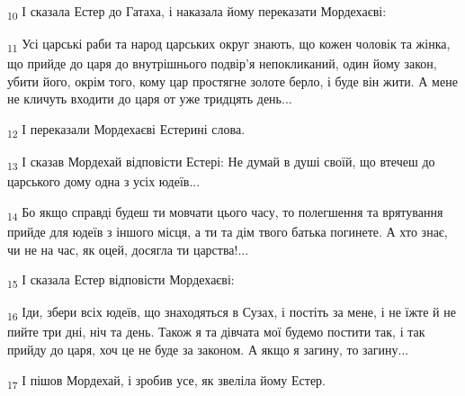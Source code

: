\begin{tcolorbox}
\textsubscript{10} І сказала Естер до Гатаха, і наказала йому переказати Мордехаєві:
\end{tcolorbox}
\begin{tcolorbox}
\textsubscript{11} Усі царські раби та народ царських округ знають, що кожен чоловік та жінка, що прийде до царя до внутрішнього подвір'я непокликаний, один йому закон, убити його, окрім того, кому цар простягне золоте берло, і буде він жити. А мене не кличуть входити до царя от уже тридцять день...
\end{tcolorbox}
\begin{tcolorbox}
\textsubscript{12} І переказали Мордехаєві Естерині слова.
\end{tcolorbox}
\begin{tcolorbox}
\textsubscript{13} І сказав Мордехай відповісти Естері: Не думай в душі своїй, що втечеш до царського дому одна з усіх юдеїв...
\end{tcolorbox}
\begin{tcolorbox}
\textsubscript{14} Бо якщо справді будеш ти мовчати цього часу, то полегшення та врятування прийде для юдеїв з іншого місця, а ти та дім твого батька погинете. А хто знає, чи не на час, як оцей, досягла ти царства!...
\end{tcolorbox}
\begin{tcolorbox}
\textsubscript{15} І сказала Естер відповісти Мордехаєві:
\end{tcolorbox}
\begin{tcolorbox}
\textsubscript{16} Іди, збери всіх юдеїв, що знаходяться в Сузах, і постіть за мене, і не їжте й не пийте три дні, ніч та день. Також я та дівчата мої будемо постити так, і так прийду до царя, хоч це не буде за законом. А якщо я загину, то загину...
\end{tcolorbox}
\begin{tcolorbox}
\textsubscript{17} І пішов Мордехай, і зробив усе, як звеліла йому Естер.
\end{tcolorbox}
